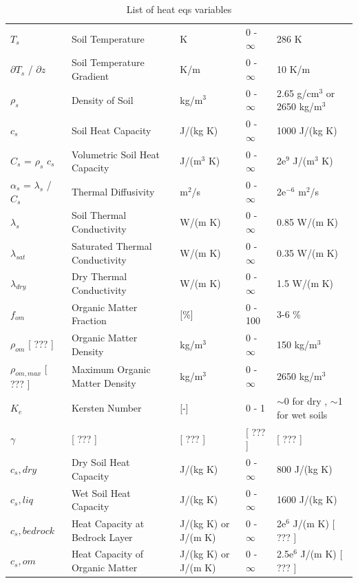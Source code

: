 \documentclass{article}
\begin{document}
\begin{table}[]
{\begin{tabular}{lllll}
$T_s$       & Soil Temperature & K & 0 - $\infty$       & 286 K \\
$\partial T_s$ /  $\partial z$       & Soil Temperature Gradient & K/m & 0 - $\infty$       & 10 K/m \\
$\rho_s$       & Density of Soil & kg/m$^3$ & 0 - $\infty$       & 2.65 g/cm$^{3}$ or 2650 kg/m$^{3}$ \\
$c_s$       & Soil Heat Capacity & J/(kg K) & 0 - $\infty$       & 1000 J/(kg K) \\
$C_s$ =  $\rho_s$  $c_s$    & Volumetric Soil Heat Capacity & J/(m$^3$ K) & 0 - $\infty$       & 2e$^{9}$ J/(m$^3$ K) \\
$\alpha_s$ =  $\lambda_s$ / $C_s$    & Thermal Diffusivity & m$^2$/s  & 0 - $\infty$       & 2e$^{-6}$ m$^2$/s \\
$\lambda_s$       & Soil Thermal Conductivity & W/(m K) & 0 - $\infty$       & 0.85 W/(m K) \\
$\lambda_{sat}$       & Saturated Thermal Conductivity & W/(m K) & 0 - $\infty$       & 0.35 W/(m K) \\
$\lambda_{dry}$       & Dry Thermal Conductivity & W/(m K) & 0 - $\infty$       & 1.5 W/(m K) \\
$f_{om}$   & Organic Matter Fraction &   [\%]        &   0 - 100           &    3-6 \%       \\
$\rho_{om}$ [ ??? ]  & Organic Matter Density & kg/m$^3$ & 0 - $\infty$       & 150 kg/m$^{3}$  \\
$\rho_{om,max}$ [ ??? ]  & Maximum Organic Matter Density &  kg/m$^3$ & 0 - $\infty$          &    2650 kg/m$^{3}$      \\
$K_e$  & Kersten Number &  [-] & 0 - 1  &   $\sim$0 for dry , $\sim$1 for wet soils      \\
$\gamma$ & [ ??? ] & [ ??? ] & [ ??? ]  &    [ ??? ]      \\
$c_s,dry$       & Dry Soil Heat Capacity & J/(kg K) & 0 - $\infty$       & 800 J/(kg K) \\
$c_s,liq$       & Wet Soil Heat Capacity & J/(kg K) & 0 - $\infty$       & 1600 J/(kg K) \\
$c_s,bedrock$       & Heat Capacity at Bedrock Layer & J/(kg K) or J/(m K) & 0 - $\infty$       & 2e$^{6}$ J/(m K) [ ??? ] \\
$c_s,om$       & Heat Capacity of Organic Matter &  J/(kg K) or J/(m K) & 0 - $\infty$       & 2.5e$^{6}$ J/(m K) [ ??? ] \\
\hline
\end{tabular}%
}
\caption{List of heat eqs variables}
\end{table}
\end{document}
